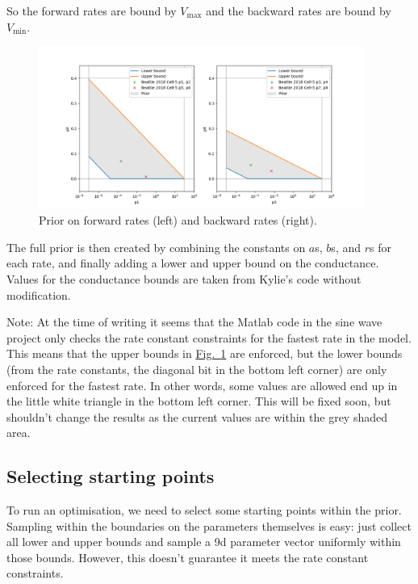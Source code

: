\documentclass[preprint,authoryear,10pt]{elsarticle}
\newcommand\fig[2][]{\hyperref[fig:#2]{Fig.~\ref*{fig:#2}\ifstrempty{#1}{}{.#1}}}
\begin{document}
So the forward rates are bound by $V_\text{max}$ and the backward rates are bound by
$V_\text{min}$.

\begin{figure}[H]
\centerline{
\includegraphics[width=0.95\textwidth]{fig/prior}
}
\caption{%
Prior on forward rates (left) and backward rates (right).
}
\label{fig:prior}
\end{figure}

The full prior is then created by combining the constants on $a$s, $b$s, and
 $r$s for each rate, and finally adding a lower and upper bound on the
 conductance.
Values for the conductance bounds are taken from Kylie's code without
 modification.

Note: At the time of writing it seems that the Matlab code in the sine wave
 project only checks the rate constant constraints for the fastest rate in
 the model.
This means that the upper bounds in \fig{prior} are enforced, but the lower
 bounds (from the rate constants, the diagonal bit in the bottom left corner)
 are only enforced for the fastest rate.
In other words, some values are allowed end up in the little white triangle in
 the bottom left corner.
This will be fixed soon, but shouldn't change the results as the current values
 are within the grey shaded area.


\subsection{Selecting starting points}

To run an optimisation, we need to select some starting points within the
 prior.
Sampling within the boundaries on the parameters themselves is easy: just
 collect all lower and upper bounds and sample a 9d parameter vector uniformly
 within those bounds.
However, this doesn't guarantee it meets the rate constant constraints.
\end{document}

